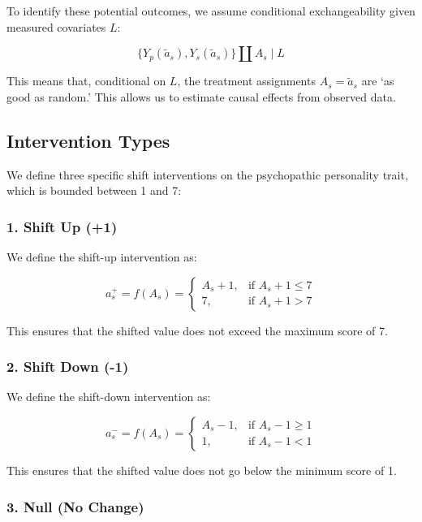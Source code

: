 \documentclass[
  singlecolumn]{article}
\begin{document}
To identify these potential outcomes, we assume conditional
exchangeability given measured covariates \(L\):

\[
\{Y_p(\tilde{a}_s), Y_s(\tilde{a}_s)\} \coprod A_s \mid L
\]

This means that, conditional on \(L\), the treatment assignments
\(A_s = \tilde{a}_s\) are `as good as random.' This allows us to
estimate causal effects from observed data.

\subsection{Intervention Types}\label{intervention-types}

We define three specific shift interventions on the psychopathic
personality trait, which is bounded between 1 and 7:

\subsubsection{1. Shift Up (+1)}\label{shift-up-1}

We define the shift-up intervention as:

\[
a_s^+ = f(A_s) = 
\begin{cases}
A_s + 1, & \text{if } A_s + 1 \leq 7 \\
7, & \text{if } A_s + 1 > 7
\end{cases}
\]

This ensures that the shifted value does not exceed the maximum score of
7.

\subsubsection{2. Shift Down (-1)}\label{shift-down--1}

We define the shift-down intervention as:

\[
a_s^- = f(A_s) = 
\begin{cases}
A_s - 1, & \text{if } A_s - 1 \geq 1 \\
1, & \text{if } A_s - 1 < 1
\end{cases}
\]

This ensures that the shifted value does not go below the minimum score
of 1.

\subsubsection{3. Null (No Change)}\label{null-no-change}
\end{document}
